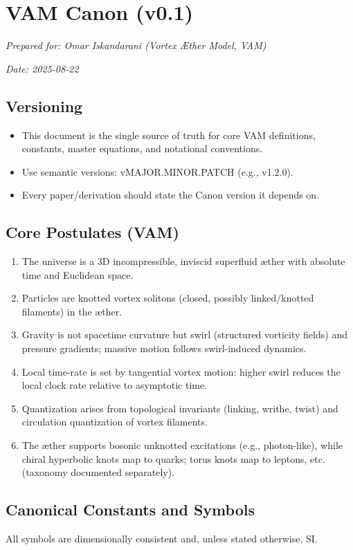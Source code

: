 \documentclass[11pt]{article}
\begin{document}
    \chapter*{VAM Canon (v0.1)}

\textit{Prepared for: Omar Iskandarani (Vortex Æther Model, VAM)}

\textit{Date: 2025‑08‑22}

\section{Versioning}
\begin{itemize}
    \item This document is the single source of truth for core VAM definitions, constants, master equations, and notational conventions.
    \item Use semantic versions: vMAJOR.MINOR.PATCH (e.g., v1.2.0).
    \item Every paper/derivation should state the Canon version it depends on.
\end{itemize}

\section{Core Postulates (VAM)}
\begin{enumerate}
    \item The universe is a 3D incompressible, inviscid superfluid æther with absolute time and Euclidean space.
    \item Particles are knotted vortex solitons (closed, possibly linked/knotted filaments) in the æther.
    \item Gravity is not spacetime curvature but swirl (structured vorticity fields) and pressure gradients; massive motion follows swirl-induced dynamics.
    \item Local time-rate is set by tangential vortex motion: higher swirl reduces the local clock rate relative to asymptotic time.
    \item Quantization arises from topological invariants (linking, writhe, twist) and circulation quantization of vortex filaments.
    \item The æther supports bosonic unknotted excitations (e.g., photon-like), while chiral hyperbolic knots map to quarks; torus knots map to leptons, etc. (taxonomy documented separately).
\end{enumerate}

\section{Canonical Constants and Symbols}
All symbols are dimensionally consistent and, unless stated otherwise, SI.
\end{document}
